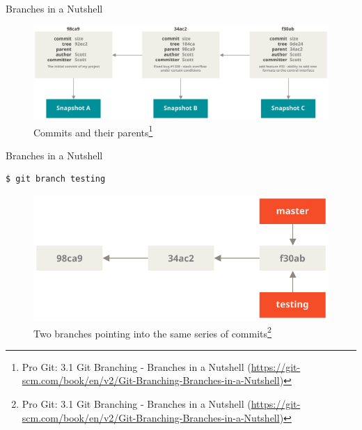 \documentclass[aspectratio=169]{beamer}
\renewcommand{\footnotesize}{\tiny}
\newcommand{\sectiontitle}{}
\begin{document}
\begin{frame}{Branches in a Nutshell}{\sectiontitle}
\begin{figure}
    \centering
    \includegraphics[width=\textwidth,height=0.6\textheight,keepaspectratio]{commits-and-parents}
    \caption{
        Commits and their parents\footnote{
            Pro Git: 3.1 Git Branching - Branches in a Nutshell
            (\url{https://git-scm.com/book/en/v2/Git-Branching-Branches-in-a-Nutshell})
        }
    }
\end{figure}
\end{frame}

\begin{frame}[fragile]{Branches in a Nutshell}{\sectiontitle}
\begin{verbatim}
$ git branch testing
\end{verbatim}
\begin{figure}
    \centering
    \includegraphics[width=\textwidth,height=0.5\textheight,keepaspectratio]{two-branches}
    \caption{
        Two branches pointing into the same series of commits\footnote{
            Pro Git: 3.1 Git Branching - Branches in a Nutshell
            (\url{https://git-scm.com/book/en/v2/Git-Branching-Branches-in-a-Nutshell})
        }
    }
\end{figure}
\end{frame}
\end{document}
